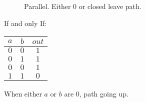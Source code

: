 \documentclass[a4paper,12pt]{article}
\begin{document}
\begin{figure}


\caption{Parallel. Either $0$ or closed leave path.}

\end{figure}

If and only If:

\begin{tabular}{|c|c|c|}
\hline
$a$	&	$b$	&	$out$	\\
\hline
$0$	&	$0$	&	$1$	\\
\hline
$0$	&	$1$	&	$1$	\\
\hline
$0$	&	$0$	&	$1$	\\
\hline
$1$	&	$1$	&	$0$	\\
\hline
\end{tabular}

When either $a$ or $b$ are $0$, path going up.
\end{document}
